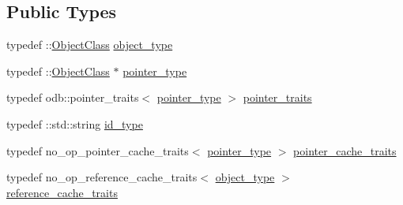 \subsection*{Public Types}
\begin{DoxyCompactItemize}
\item 
typedef \+::\hyperlink{class_object_class}{Object\+Class} \hyperlink{classodb_1_1access_1_1object__traits_3_01_1_1_object_class_01_4_ace038dbac6a8699ff387d2de36db3f85}{object\+\_\+type}
\item 
typedef \+::\hyperlink{class_object_class}{Object\+Class} $\ast$ \hyperlink{classodb_1_1access_1_1object__traits_3_01_1_1_object_class_01_4_aa5d43ba0b1deaba264a36533aa717c6e}{pointer\+\_\+type}
\item 
typedef odb\+::pointer\+\_\+traits$<$ \hyperlink{classodb_1_1access_1_1object__traits_3_01_1_1_object_class_01_4_aa5d43ba0b1deaba264a36533aa717c6e}{pointer\+\_\+type} $>$ \hyperlink{classodb_1_1access_1_1object__traits_3_01_1_1_object_class_01_4_af56a3028906a70d94db3a68125ef8989}{pointer\+\_\+traits}
\item 
typedef \+::std\+::string \hyperlink{classodb_1_1access_1_1object__traits_3_01_1_1_object_class_01_4_ad099d55d95356877555ff87c5d99e370}{id\+\_\+type}
\item 
typedef no\+\_\+op\+\_\+pointer\+\_\+cache\+\_\+traits$<$ \hyperlink{classodb_1_1access_1_1object__traits_3_01_1_1_object_class_01_4_aa5d43ba0b1deaba264a36533aa717c6e}{pointer\+\_\+type} $>$ \hyperlink{classodb_1_1access_1_1object__traits_3_01_1_1_object_class_01_4_a5775e1f98b50791c5c6040d14616268a}{pointer\+\_\+cache\+\_\+traits}
\item 
typedef no\+\_\+op\+\_\+reference\+\_\+cache\+\_\+traits$<$ \hyperlink{classodb_1_1access_1_1object__traits_3_01_1_1_object_class_01_4_ace038dbac6a8699ff387d2de36db3f85}{object\+\_\+type} $>$ \hyperlink{classodb_1_1access_1_1object__traits_3_01_1_1_object_class_01_4_a58ee8cec630089f4cbe01c12319d999a}{reference\+\_\+cache\+\_\+traits}
\end{DoxyCompactItemize}
